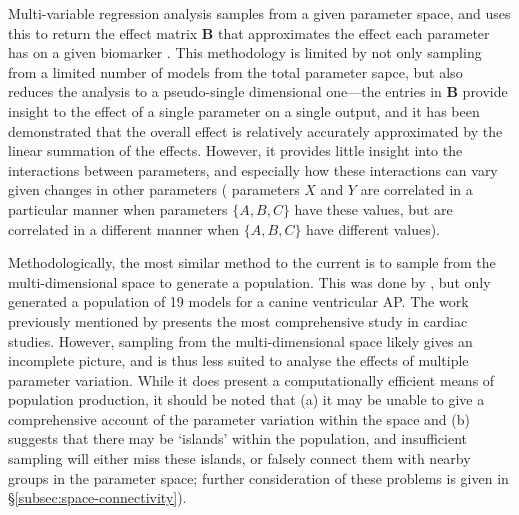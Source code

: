 \documentclass[../thesis-main.tex]{subfiles}
\begin{document}
Multi-variable regression analysis samples from a given parameter space, and uses this to return the effect matrix $\mathbf{B}$ that approximates the effect each parameter has on a given biomarker \citep{Sobie2009, Sobie2011, Sarkar2010, Sarkar2011}. This methodology is limited by not only sampling from a limited number of models from the total parameter sapce, but also reduces the analysis to a pseudo-single dimensional one---the entries in $\mathbf{B}$ provide insight to the effect of a single parameter on a single output, and it has been demonstrated that the overall effect is relatively accurately approximated by the linear summation of the effects. However, it provides little insight into the interactions between parameters, and especially how these interactions can vary given changes in other parameters (\idest{} parameters $X$ and $Y$ are correlated in a particular manner when parameters $\{A, B, C\}$ have these values, but are correlated in a different manner when $\{A, B, C\}$ have different values).

Methodologically, the most similar method to the current is to sample from the multi-dimensional space to generate a population. This was done by \citep{Davies2012}, but only generated a population of 19 models for a canine ventricular AP. The work previously mentioned by \citet{Britton2013} presents the most comprehensive study in cardiac studies. However, sampling from the multi-dimensional space likely gives an incomplete picture, and is thus less suited to analyse the effects of multiple parameter variation. While it does present a computationally efficient means of population production, it should be noted that (a) it may be unable to give a comprehensive account of the parameter variation within the space and (b) \citet{Gemmell2010a} suggests that there may be `islands' within the population, and insufficient sampling will either miss these islands, or falsely connect them with nearby groups in the parameter space; further consideration of these problems is given in \S\ref{subsec:space-connectivity}).
\end{document}
